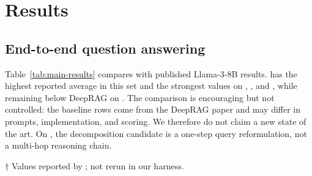 \section{Results}
\label{sec:results}

\subsection{End-to-end question answering}
\label{sec:qa-results}

Table~\ref{tab:main-results} compares \method{} with published
Llama-3-8B results. \method{} has the highest reported average in this set and
the strongest values on \twowiki{}, \musique{}, and \popqa{}, while remaining
below DeepRAG on \hotpot{}. The comparison is encouraging but not controlled:
the baseline rows come from the DeepRAG paper and may differ in prompts,
implementation, and scoring. We therefore do not claim a new state of the art.
On \popqa{}, the decomposition candidate is a one-step query reformulation,
not a multi-hop reasoning chain.

\begin{table}[t]
\caption{EM/F1 compared with reported Llama-3-8B results.}
\label{tab:main-results}
\centering
\scriptsize
\setlength{\tabcolsep}{2.6pt}
\vspace{2pt}
\parbox{\linewidth}{\scriptsize \(\dagger\) Values reported by
\citet{deeprag}; not rerun in our harness.}
\end{table}

